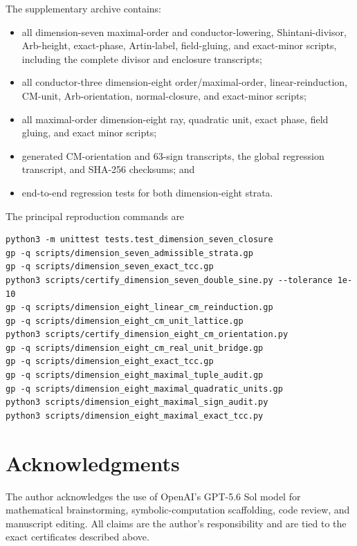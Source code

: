 \documentclass[11pt]{article}
\begin{document}
The supplementary archive contains:
\begin{itemize}
\item all dimension-seven maximal-order and conductor-lowering,
  Shintani-divisor, Arb-height, exact-phase, Artin-label, field-gluing,
  and exact-minor scripts, including the complete divisor and
  enclosure transcripts;
\item all conductor-three dimension-eight order/maximal-order,
  linear-reinduction, CM-unit, Arb-orientation, normal-closure, and
  exact-minor scripts;
\item all maximal-order dimension-eight ray, quadratic unit, exact
  phase, field gluing, and exact minor scripts;
\item generated CM-orientation and $63$-sign transcripts, the global
  regression transcript, and SHA-256 checksums; and
\item end-to-end regression tests for both dimension-eight strata.
\end{itemize}

The principal reproduction commands are
\begin{verbatim}
python3 -m unittest tests.test_dimension_seven_closure
gp -q scripts/dimension_seven_admissible_strata.gp
gp -q scripts/dimension_seven_exact_tcc.gp
python3 scripts/certify_dimension_seven_double_sine.py --tolerance 1e-10
gp -q scripts/dimension_eight_linear_cm_reinduction.gp
gp -q scripts/dimension_eight_cm_unit_lattice.gp
python3 scripts/certify_dimension_eight_cm_orientation.py
gp -q scripts/dimension_eight_cm_real_unit_bridge.gp
gp -q scripts/dimension_eight_exact_tcc.gp
gp -q scripts/dimension_eight_maximal_tuple_audit.gp
gp -q scripts/dimension_eight_maximal_quadratic_units.gp
python3 scripts/dimension_eight_maximal_sign_audit.py
python3 scripts/dimension_eight_maximal_exact_tcc.py
\end{verbatim}

\section*{Acknowledgments}

The author acknowledges the use of OpenAI's GPT-5.6 Sol model for
mathematical brainstorming, symbolic-computation scaffolding, code
review, and manuscript editing.  All claims are the author's
responsibility and are tied to the exact certificates described above.
\end{document}
